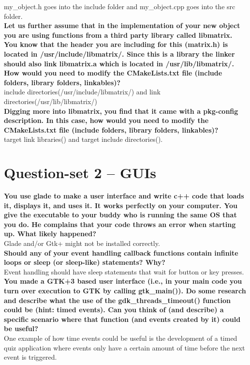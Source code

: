 \documentclass{article}
\begin{document}
my_object.h goes into the include folder and my_object.cpp goes into the src folder. \\


\textbf{Let us further assume that in the implementation of your new object you are using functions from a third party library called libmatrix. You know that the header you are including for this (matrix.h) is located in /usr/include/libmatrix/. Since this is a library the linker should also link libmatrix.a which is located in /usr/lib/libmatrix/. How would you need to modify the CMakeLists.txt file (include folders, library folders, linkables)?}\\

include directories(/usr/include/libmatrix/) and link directories(/usr/lib/libmatrix/)\\

\textbf{Digging more into libmatrix, you find that it came with a pkg-config description. In this case, how would you need to modify the CMakeLists.txt file (include folders, library folders, linkables)?}\\

target link libraries() and target include directories(). \\

\section{Question-set 2 -- GUIs}
\textbf{You use glade to make a user interface and write c++ code that loads it, displays it, and uses it. It works perfectly on your computer. You give the executable to your buddy who is running the same OS that you do. He complains that your code throws an error when starting up. What likely happened? }\\

Glade and/or Gtk+ might not be installed correctly. \\


\textbf{Should any of your event handling callback functions contain infinite loops or sleep (or sleep-like) statements? Why? }\\

Event handling should have sleep statements that wait for button or key presses. \\

\textbf{You made a GTK+3 based user interface (i.e., in your main code you turn over execution to GTK by calling gtk\_main()). Do some research and describe what the use of the gdk\_threads\_timeout() function could be (hint: timed events). Can you think of (and describe) a specific scenario where that function (and events created by it) could be useful?}\\

One example of how time events could be useful is the development of a timed quiz application where events only have a certain amount of time before the next event is triggered. \\
\end{document}
